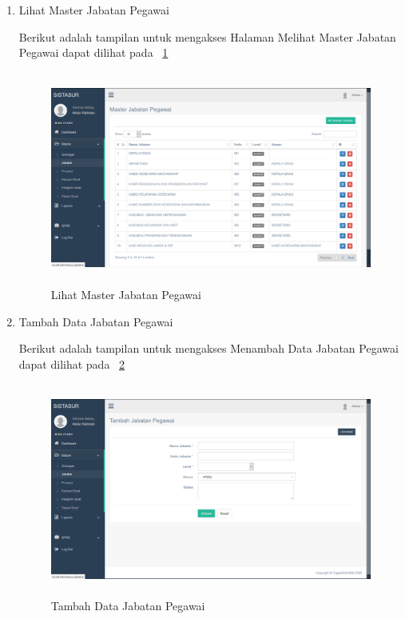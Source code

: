 \begin{enumerate}
\begin{enumerate}
		\item Lihat Master Jabatan Pegawai
		
		Berikut adalah tampilan untuk mengakses Halaman Melihat Master Jabatan Pegawai dapat dilihat pada \pic~\ref{lihatMasterJabatanPegawai}
		
		\begin{figure}
			\centering
			\includegraphics [height= 7cm, width=11cm]{konten/gambar/UISistemSurat/Admin/4.lihatMasterJabatanPegawai.png}
			\caption{Lihat Master Jabatan Pegawai}
			\label{lihatMasterJabatanPegawai}
		\end{figure}
		
		\item Tambah Data Jabatan Pegawai
		
		Berikut adalah tampilan untuk mengakses Menambah Data Jabatan Pegawai dapat dilihat pada \pic~\ref{TambahDataJabatanPegawai}
		
		\begin{figure}
			\centering
			\includegraphics [height= 7cm, width=11cm]{konten/gambar/UISistemSurat/Admin/5.TambahDataJabatanPegawai.png}
			\caption{Tambah Data Jabatan Pegawai}
			\label{TambahDataJabatanPegawai}
		\end{figure}	
		

\end{enumerate}
\end{enumerate}
